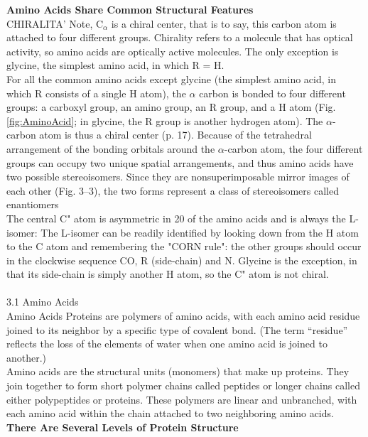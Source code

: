 \textbf{Amino Acids Share Common Structural Features}\\
CHIRALITA'
Note, C$_\alpha$ is a chiral center, that is to say, this carbon atom is attached to four different groups. Chirality refers to a molecule that has optical activity, so amino acids are optically active molecules. The only exception is glycine, the simplest amino acid, in which R = H.
\\
For all the common amino acids except glycine (the simplest amino acid, in which R consists of a single H atom), the  $\alpha$ carbon is bonded to four different groups: a carboxyl group, an amino group, an R group, and a H atom (Fig. \ref{fig:AminoAcid}; in glycine, the R group is another hydrogen atom). The  $\alpha$-carbon atom is thus a chiral center (p. 17). Because of the tetrahedral arrangement of the bonding orbitals around the  $\alpha$-carbon atom, the four different groups can occupy two unique spatial arrangements, and thus amino acids have two possible stereoisomers. Since they are nonsuperimposable mirror images of each other (Fig. 3--3), the two forms represent a class of stereoisomers called enantiomers
\cite{nelson2008lehninger}
\\
The central C" atom is asymmetric in 20 of the amino acids and is always the L-isomer:
The L-isomer can be readily identified by looking down from the H atom to the C atom and
remembering the "CORN rule": the other groups should occur in the clockwise sequence CO, R
(side-chain) and N. Glycine is the exception, in that its side-chain is simply another H atom, so the
C" atom is not chiral.
\cite{creighton2010biophysical}\\
\\
3.1 Amino Acids\\
Amino Acids Proteins are polymers of amino acids, with each amino acid residue joined to its neighbor by a specific type of covalent bond. (The term ``residue'' reflects the loss of the elements of water when one amino acid is joined to another.) 
\\
Amino acids are the structural units (monomers) that make up proteins. They join together to form short polymer chains called peptides or longer chains called either polypeptides or proteins. These polymers are linear and unbranched, with each amino acid within the chain attached to two neighboring amino acids.\\
\textbf{There Are Several Levels of Protein Structure}\\
